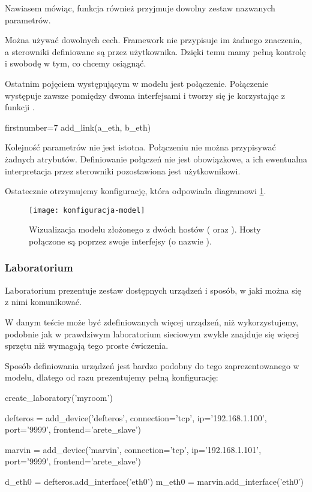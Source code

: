 \documentclass[00-praca-magisterska.tex]{subfiles}
\begin{document}
Nawiasem mówiąc, funkcja  również przyjmuje dowolny zestaw
nazwanych parametrów.

Można używać dowolnych cech. Framework nie przypisuje im żadnego znaczenia, a
sterowniki definiowane są przez użytkownika. Dzięki temu mamy pełną kontrolę i
swobodę w tym, co chcemy osiągnąć.

Ostatnim pojęciem występującym w modelu jest połączenie. Połączenie występuje
zawsze pomiędzy dwoma interfejsami i tworzy się je korzystając z funkcji
.

\begin{pythoncode*}{firstnumber=7}
  add_link(a_eth, b_eth)
\end{pythoncode*}

Kolejność parametrów nie jest istotna. Połączeniu nie można przypisywać żadnych
atrybutów. Definiowanie połączeń nie jest obowiązkowe, a ich ewentualna
interpretacja przez sterowniki pozostawiona jest użytkownikowi. 

Ostatecznie otrzymujemy konfigurację, która odpowiada diagramowi \ref{fig:konfiguracja-model}.

\begin{figure}[htb]
\begin{center}
\leavevmode
\texttt{[image: konfiguracja-model]}
\end{center}
\caption{Wizualizacja modelu złożonego z dwóch hostów ( oraz
). Hosty połączone są poprzez swoje interfejsy (o nazwie ).}
\label{fig:konfiguracja-model}
\end{figure}

\label{arete-master-config-lab}
\subsubsection{Laboratorium}

Laboratorium prezentuje zestaw dostępnych urządzeń i sposób, w jaki można się
z nimi komunikować.

W danym teście może być zdefiniowanych więcej urządzeń, niż wykorzystujemy, podobnie
jak w prawdziwym laboratorium sieciowym zwykle znajduje się więcej sprzętu niż
wymagają tego proste ćwiczenia.

Sposób definiowania urządzeń jest bardzo podobny do tego zaprezentowanego w
modelu, dlatego od razu prezentujemy pełną konfigurację:

\begin{pythoncode}
  create_laboratory('myroom')

  defteros = add_device('defteros',
      connection='tcp',
      ip='192.168.1.100',
      port='9999',
      frontend='arete_slave')

  marvin = add_device('marvin',
      connection='tcp',
      ip='192.168.1.101',
      port='9999',
      frontend='arete_slave')

  d_eth0 = defteros.add_interface('eth0')
  m_eth0 = marvin.add_interface('eth0')
\end{pythoncode}
\end{document}
